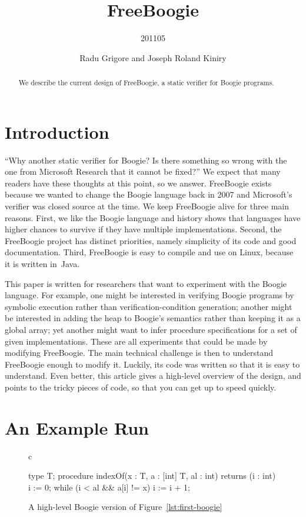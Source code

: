 \documentclass{llncs}
\title{FreeBoogie}
\subtitle{201105}
\author{Radu Grigore\inst{1} and Joseph Roland Kiniry\inst{2}}
\institute{Queen Mary, University of London
\and IT University of Copenhagen}
\newcommand{\bc}{\begin{figure}\centering\begin{tabular}{c}} %
\newcommand{\ec}[2]{\end{tabular}\caption{#1}\label{#2}\end{figure}} %
\begin{document}
\maketitle
\begin{abstract}
We describe the current design of FreeBoogie, a static verifier for Boogie
programs.
\end{abstract}
\section{Introduction} %

``Why another static verifier for Boogie? Is there something so wrong with
the one from Microsoft Research that it cannot be fixed?'' We expect that
many readers have these thoughts at this point, so we answer.  FreeBoogie
exists because we wanted to change the Boogie language back in 2007 and
Microsoft's verifier was closed source at the time. We keep FreeBoogie
alive for three main reasons. First, we like the Boogie language and
history shows that languages have higher chances to survive if they have
multiple implementations. Second, the FreeBoogie project has distinct
priorities, namely simplicity of its code and good documentation. Third,
FreeBoogie is easy to compile and use on Linux, because it is written
in~Java.

This paper is written for researchers that want to experiment with the
Boogie language. For example, one might be interested in verifying Boogie
programs by symbolic execution rather than verification-condition
generation; another might be interested in adding the heap to Boogie's
semantics rather than keeping it as a global array; yet another might want
to infer procedure specifications for a set of given implementations. These
are all experiments that could be made by modifying FreeBoogie. The main
technical challenge is then to understand FreeBoogie enough to modify it.
Luckily, its code was written so that it is easy to understand. Even
better, this article gives a high-level overview of the design, and points
to the tricky pieces of code, so that you can get up to speed quickly.

\section{An Example Run} %
\bc
\begin{boogie}
type T;
procedure indexOf(x : T, a : [int] T, al : int) returns (i : int) {
  i := 0;
  while (i < al && a[i] != x) { i := i + 1; }
}
\end{boogie}
\ec{A high-level Boogie version of Figure~\ref{lst:first-boogie}}
{lst:boogie-indexof}
\end{document}
